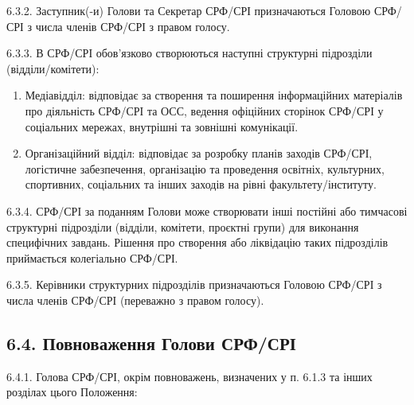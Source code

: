    6.3.2. Заступник(-и) Голови та Секретар СРФ/СРІ призначаються Головою СРФ/СРІ з числа членів СРФ/СРІ з правом голосу.

    6.3.3. В СРФ/СРІ обов'язково створюються наступні структурні підрозділи (відділи/комітети):

        \begin{enumerate}[label=\alph*)]
            \item Медіавідділ: відповідає за створення та поширення інформаційних матеріалів про діяльність СРФ/СРІ та ОСС, ведення офіційних сторінок СРФ/СРІ у соціальних мережах, внутрішні та зовнішні комунікації.
            \item Організаційний відділ: відповідає за розробку планів заходів СРФ/СРІ, логістичне забезпечення, організацію та проведення освітніх, культурних, спортивних, соціальних та інших заходів на рівні факультету/інституту.
        \end{enumerate}

    6.3.4. СРФ/СРІ за поданням Голови може створювати інші постійні або тимчасові структурні підрозділи (відділи, комітети, проєктні групи) для виконання специфічних завдань. Рішення про створення або ліквідацію таких підрозділів приймається колегіально СРФ/СРІ.

    6.3.5. Керівники структурних підрозділів призначаються Головою СРФ/СРІ з числа членів СРФ/СРІ (переважно з правом голосу).

\subsection*{6.4. Повноваження Голови СРФ/СРІ}
    6.4.1. Голова СРФ/СРІ, окрім повноважень, визначених у п. 6.1.3 та інших розділах цього Положення:

